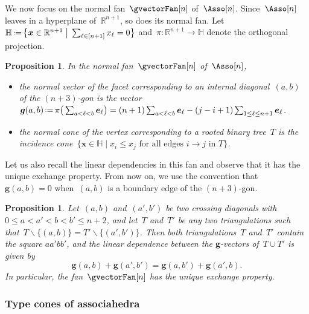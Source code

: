 \documentclass{amsart}
\newtheorem{proposition}[theorem]{Proposition}
\theoremstyle{definition}
\newcommand{\R}{\mathbb{R}} %
\newcommand{\HH}{\mathbb{H}} %
\renewcommand{\b}[1]{{\boldsymbol{#1}}} %
\newcommand{\bigset}[2]{\big\{ #1 \;\big|\; #2 \big\}} %
\newcommand{\ssm}{\smallsetminus} %
\newcommand{\eqdef}{\mbox{\,\raisebox{0.2ex}{\scriptsize\ensuremath{\mathrm:}}\ensuremath{=}\,}} %
\newcommand{\gvector}[1]{\b{g}(#1)} %
\begin{document}
We now focus on the normal fan~$\gvectorFan[n]$ of~$\Asso[n]$.
Since~$\Asso[n]$ leaves in a hyperplane of~$\R^{n+1}$, so does its normal fan.
Let~$\HH \eqdef \bigset{\b{x} \in \R^{n+1}}{\sum_{\ell \in [n+1]} x_\ell = 0}$ and~$\pi : \R^{n+1} \to \HH$ denote the orthogonal projection.

\begin{proposition}
\label{prop:normalFanLoday}
In the normal fan~$\gvectorFan[n]$ of~$\Asso[n]$, 
\begin{itemize}
\item the normal vector of the facet corresponding to an internal diagonal~$(a,b)$ of the $(n+3)$-gon is the vector~$\gvector{a,b} \eqdef \pi\big( \sum_{a < \ell < b} \b{e}_\ell \big) = (n+1) \sum_{a < \ell < b} \b{e}_\ell - (j-i+1) \sum_{1 \le \ell \le n+1} \b{e}_\ell$.
\item the normal cone of the vertex corresponding to a rooted binary tree~$T$ is the incidence cone~$\bigset{\b{x} \in \HH}{x_i \le x_j \text{ for all edges $i \to j$ in $T$}}$.
\end{itemize}
\end{proposition}

Let us also recall the linear dependencies in this fan and observe that it has the unique exchange property.
From now on, we use the convention that~$\gvector{a,b} = 0$ when~$(a,b)$ is a boundary edge of the $(n+3)$-gon.

\begin{proposition}
\label{prop:exchangeablePairsAsso}
Let~$(a,b)$ and~$(a',b')$ be two crossing diagonals with~${0 \le a < a' < b < b' \le n+2}$, and let~$T$ and~$T'$ be any two triangulations such that~$T \ssm \{(a,b)\} = T' \ssm \{(a',b')\}$.
Then both triangulations~$T$ and~$T'$ contain the square $aa'bb'$, and the linear dependence between the $\b{g}$-vectors of~$T \cup T'$ is given by
\[
\gvector{a,b} + \gvector{a',b'} = \gvector{a,b'} + \gvector{a',b}.
\]
In particular, the fan~$\gvectorFan[n]$ has the unique exchange property.
\end{proposition}

\subsubsection{Type cones of associahedra}
\end{document}
